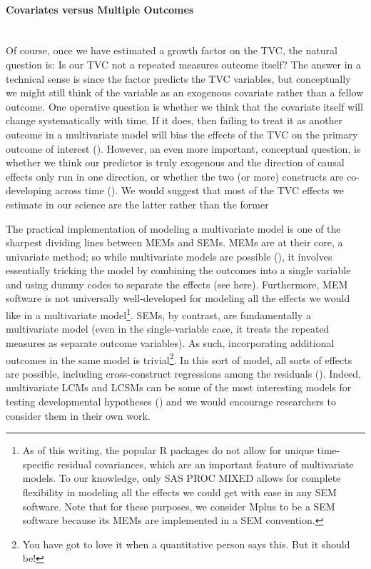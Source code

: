 \documentclass[11pt]{article}
\newcommand{\subsubsubsection}[1]{\paragraph{#1}\mbox{}\\}  %
\begin{document}
\subsubsubsection{Covariates versus Multiple Outcomes}
Of course, once we have estimated a growth factor on the TVC, the natural question is: Is our TVC not a repeated measures outcome itself? The answer in a technical sense is  since the factor predicts the TVC variables, but conceptually we might still think of the variable as an exogenous covariate rather than a fellow outcome. One operative question is whether we think that the covariate itself will change systematically with time. If it does, then failing to treat it as another outcome in a multivariate model will bias the effects of the TVC on the primary outcome of interest (\cite{curran_disaggregation_2011,mccormick_multi-level_2021}). However, an even more important, conceptual question, is whether we think our predictor is truly exogenous and the direction of causal effects only run in one direction, or whether the two (or more) constructs are co-developing across time (\cite{curran_challenge_2021}). We would suggest that most of the TVC effects we estimate in our science are the latter rather than the former

The practical implementation of modeling a multivariate model is one of the sharpest dividing lines between MEMs and SEMs. MEMs are at their core, a univariate method; so while multivariate models are possible (\cite{baldwin_analyzing_2014,curran_multivariate_2023,maccallum_studying_1997}), it involves essentially tricking the model by combining the outcomes into a single variable and using dummy codes to separate the effects (see here). Furthermore, MEM software is not universally well-developed for modeling all the effects we would like in a multivariate model\footnote{As of this writing, the popular R packages do not allow for unique time-specific residual covariances, which are an important feature of multivariate models. To our knowledge, only SAS PROC MIXED allows for complete flexibility in modeling all the effects we could get with ease in any SEM software. Note that for these purposes, we consider Mplus to be a SEM software because its MEMs are implemented in a SEM convention.}. SEMs, by contrast, are fundamentally a multivariate model (even in the single-variable case, it treats the repeated measures as separate outcome variables). As such, incorporating additional outcomes in the same model is trivial\footnote{You have got to love it when a quantitative person says this. But it should be!}. In this sort of model, all sorts of effects are possible, including cross-construct regressions among the residuals (\cite{curran_separation_2014,curran_challenge_2021,usami_unified_2019}). Indeed, multivariate LCMs and LCSMs can be some of the most interesting models for testing developmental hypotheses (\cite{curran_challenge_2021,grimm_recent_2012,mcardle_modeling_2009}) and we would encourage researchers to consider them in their own work.
\end{document}
